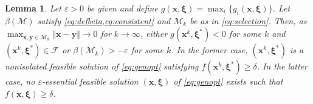 \documentclass[a4paper,10pt,journal]{IEEEtran}
\let\vec\bm
\newtheorem{lemma}{Lemma}
\begin{document}
\begin{lemma} \label{lem:conv}
	Let $\varepsilon> 0$ be given and define $g(\vec x, \vec\xi) = \max_i\{g_i(\vec x, \vec\xi)\}$. Let $\beta(\mathcal M)$ satisfy \cref{eq:defbeta,eq:consistent} and $\mathcal M_k$ be as in \cref{eq:selection}. Then, as $\max_{\vec x, \vec y\in\mathcal M_k} \Vert \vec x - \vec y \Vert \rightarrow 0$ for $k\to\infty$,
	either $g(\vec x^k, \vec\xi^*) < 0$ for some $k$ and $(\vec x^k, \vec\xi^*)\in\mathcal F$ or $\beta(\mathcal M_k) > -\varepsilon$ for some $k$. In the former case, $(\vec x^k, \vec\xi^*)$ is a nonisolated feasible solution of \cref{eq:genopt} satisfying $f(\vec x^k, \vec\xi^*)\ge\delta$. In the latter case, no $\varepsilon$-essential feasible solution $(\vec x, \vec\xi)$ of \cref{eq:genopt} exists such that $f(\vec x, \vec\xi)\ge\delta$.
\end{lemma}
\end{document}
